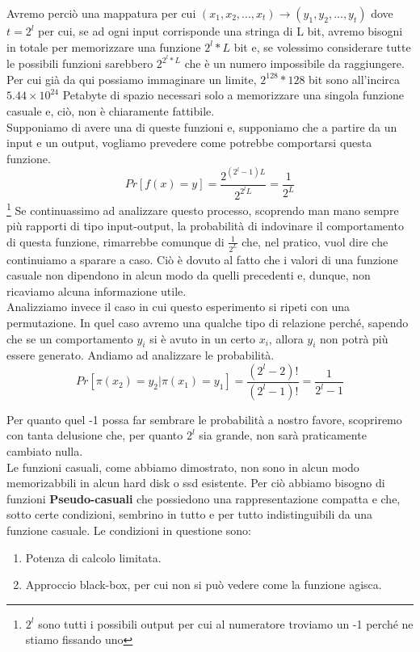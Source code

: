 Avremo perciò una mappatura per cui $(x_1,x_2,...,x_t)\xrightarrow{}(y_1,y_2,...,y_t)$ dove $t=2^l$ per cui, se ad ogni input corrisponde una stringa di L bit, avremo bisogni in totale per memorizzare una funzione $2^l*L$ bit e, se volessimo considerare tutte le possibili funzioni sarebbero $2^{2^l*L}$ che è un numero impossibile da raggiungere. Per cui già da qui possiamo immaginare un limite, $2^{128} * 128$ bit sono all'incirca $5.44\times10^{24}$ Petabyte di spazio necessari solo a memorizzare una singola funzione casuale e, ciò, non è chiaramente fattibile. 
\\
Supponiamo di avere una di queste funzioni e, supponiamo che a partire da un input e un output, vogliamo prevedere come potrebbe comportarsi questa funzione. 
\[Pr[f(x)=y] =\frac{2^{(2^l-1)L}}{2^{2^lL}}= \frac{1}{2^L}\]\footnote{$2^l$ sono tutti i possibili output per cui al numeratore troviamo un -1 perché ne stiamo fissando uno}
Se continuassimo ad analizzare questo processo, scoprendo man mano sempre più rapporti di tipo input-output, la probabilità di indovinare il comportamento di questa funzione, rimarrebbe comunque di $\frac{1}{2^L}$ che, nel pratico, vuol dire che continuiamo a sparare a caso. Ciò è dovuto al fatto che i valori di una funzione casuale non dipendono in alcun modo da quelli precedenti e, dunque, non ricaviamo alcuna informazione utile.\\
Analizziamo invece il caso in cui questo esperimento si ripeti con una permutazione. In quel caso avremo una qualche tipo di relazione perché, sapendo che se un comportamento $y_i$ si è avuto in un certo $x_i$, allora $y_i$ non potrà più essere generato. Andiamo ad analizzare le probabilità.
\[Pr[\pi(x_2)=y_2|\pi(x_1)=y_1]=\frac{(2^l-2)!}{(2^l-1)!} =\frac{1}{2^l-1}\]

Per quanto quel -1 possa far sembrare le probabilità a nostro favore, scopriremo con tanta delusione che, per quanto $2^l$ sia grande, non sarà praticamente cambiato nulla.
\\
Le funzioni casuali, come abbiamo dimostrato, non sono in alcun modo memorizabbili in alcun hard disk o ssd esistente. Per ciò abbiamo bisogno di funzioni \textbf{Pseudo-casuali} che possiedono una rappresentazione compatta e che, sotto certe condizioni, sembrino in tutto e per tutto indistinguibili da una funzione casuale.  Le condizioni in questione sono:
\begin{enumerate}
    \item Potenza di calcolo limitata.
    \item Approccio black-box, per cui non si può vedere come la funzione agisca. 
\end{enumerate}


